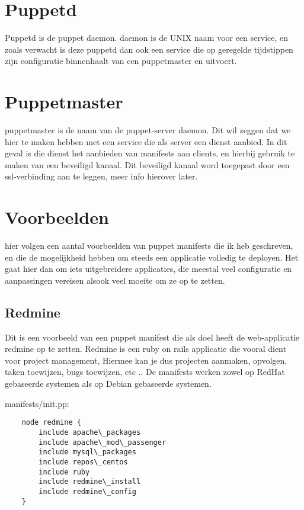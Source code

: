 \section{Puppetd}

Puppetd is de puppet daemon. daemon is de UNIX naam voor een service, en zoals verwacht is deze puppetd dan ook een service die op geregelde tijdstippen zijn configuratie binnenhaalt van een puppetmaster en uitvoert.

\section{Puppetmaster}

puppetmaster is de naam van de puppet-server daemon. Dit wil zeggen dat we hier te maken hebben met een service die als server een dienst aanbied. In dit geval is die dienst het aanbieden van manifests aan clients, en hierbij gebruik te maken van een beveiligd kanaal.
Dit beveiligd kanaal word toegepast door een ssl-verbinding aan te leggen, meer info hierover later.

\section{Voorbeelden}
hier volgen een aantal voorbeelden van puppet manifests die ik heb geschreven, en die de mogelijkheid hebben om steeds een applicatie volledig te deployen.
Het gaat hier dan om iets uitgebreidere applicaties, die meestal veel configuratie en aanpassingen vereisen alsook veel moeite om ze op te zetten.

\subsection{Redmine}
Dit is een voorbeeld van een puppet manifest die als doel heeft de web-applicatie redmine op te zetten.
Redmine is een ruby on rails applicatie die vooral dient voor project management,
Hiermee kan je dus projecten aanmaken, opvolgen, taken toewijzen, bugs toewijzen, etc ..
De manifests werken zowel op RedHat gebaseerde systemen als op Debian gebaseerde systemen.

manifests/init.pp:

\begin{verbatim}
	node redmine {
		include apache\_packages
		include apache\_mod\_passenger
		include mysql\_packages
		include repos\_centos
		include ruby
		include redmine\_install
		include redmine\_config
	}
\end{verbatim}

